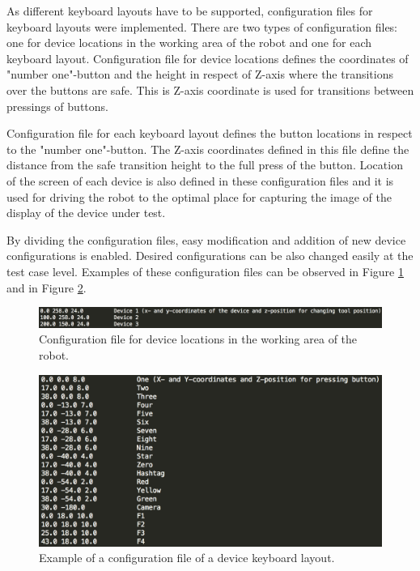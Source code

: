 As different keyboard layouts have to be supported, configuration files for keyboard layouts were implemented. There are two types of configuration files: one for device locations in the working area of the robot and one for each keyboard layout. Configuration file for device locations defines the coordinates of "number one"-button and the height in respect of Z-axis where the transitions over the buttons are safe. This is Z-axis coordinate is used for transitions between pressings of buttons. 

Configuration file for each keyboard layout defines the button locations in respect to the "number one"-button. The Z-axis coordinates defined in this file define the distance from the safe transition height to the full press of the button. Location of the screen of each device is also defined in these configuration files and it is used for driving the robot to the optimal place for capturing the image of the display of the device under test. 

By dividing the configuration files, easy modification and addition of new device configurations is enabled. Desired configurations can be also changed easily at the test case level. Examples of these configuration files can be observed in Figure \ref{fig:conf1} and in Figure \ref{fig:conf2}.

\begin{figure}[ht]
  \begin{center}
    \includegraphics[width=\textwidth]{images/conf1.png}
    \caption{Configuration file for device locations in the working area of the robot.}
    \label{fig:conf1}
  \end{center}
\end{figure}
\FloatBarrier

\begin{figure}[ht]
  \begin{center}
    \includegraphics[width=11	cm]{images/conf2.png}
    \caption{Example of a configuration file of a device keyboard layout.}
    \label{fig:conf2}
  \end{center}
\end{figure}
\FloatBarrier

